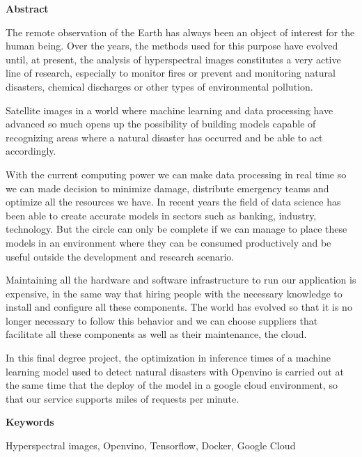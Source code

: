 \begin{center}
{\bf \Huge Abstract}

\end{center}

The remote observation of the Earth has always been an object of interest for the human being.
Over the years, the methods used for this purpose have evolved until, at present, the analysis of hyperspectral images constitutes a very active line of research, especially
to monitor fires or prevent and monitoring natural disasters, chemical discharges or other types of environmental pollution.

Satellite images in a world where machine learning and data processing have advanced so much opens up the possibility of building models capable of recognizing areas where a natural
disaster has occurred and be able to act accordingly.

With the current computing power we can make data processing in real time so we can made decision to minimize damage, distribute emergency teams and optimize all the resources we have.
In recent years the field of data science has been able to create accurate models in sectors such as banking, industry, technology.
But the circle can only be complete if we can manage to place these models in an environment where they can be consumed productively and be useful outside the development and research scenario.

Maintaining all the hardware and software infrastructure to run our application is expensive, in the same way that hiring people with the necessary
knowledge to install and configure all these components.
The world has evolved so that it is no longer necessary to follow this behavior and we can choose suppliers that facilitate all these components as well as their maintenance, the cloud.

In this final degree project, the optimization in inference times of a machine learning model used to detect natural disasters with Openvino is carried out at the same time that the
deploy of the model in a google cloud environment, so that our service supports miles of requests per minute.

\vspace{0.8cm}
\begin{center}

{\bf \Large Keywords}

\end{center}

Hyperspectral images, Openvino, Tensorflow, Docker, Google Cloud

\vspace{0.5cm}

\mbox{}
